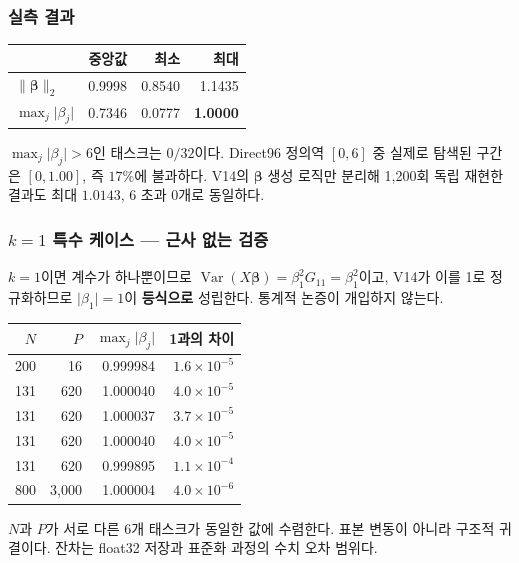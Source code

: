 \documentclass[11pt,a4paper]{article}
\theoremstyle{definition}
\newcommand{\bbeta}{\boldsymbol{\beta}}
\begin{document}
\subsubsection{실측 결과}

\begin{center}
\begin{tabular}{@{}lrrr@{}}
\toprule
& \textbf{중앙값} & \textbf{최소} & \textbf{최대}\\
\midrule
\(\lVert\bbeta\rVert_2\) & 0.9998 & 0.8540 & 1.1435\\
\(\max_j\lvert\beta_j\rvert\) & 0.7346 & 0.0777 & \textbf{1.0000}\\
\bottomrule
\end{tabular}
\end{center}

\(\max_j\lvert\beta_j\rvert>6\)인 태스크는 \(0/32\)이다. Direct96 정의역 \([0,6]\) 중 실제로 탐색된 구간은 \([0,1.00]\), 즉 \(17\%\)에 불과하다. V14의 \(\bbeta\) 생성 로직만 분리해 1{,}200회 독립 재현한 결과도 최대 \(1.0143\), 6 초과 0개로 동일하다.

\subsubsection{\(k=1\) 특수 케이스 --- 근사 없는 검증}

\(k=1\)이면 계수가 하나뿐이므로 \(\operatorname{Var}(X\bbeta)=\beta_1^2 G_{11}=\beta_1^2\)이고, V14가 이를 1로 정규화하므로 \(\lvert\beta_1\rvert=1\)이 \textbf{등식으로} 성립한다. 통계적 논증이 개입하지 않는다.

\begin{center}
\small
\begin{tabular}{@{}rrrr@{}}
\toprule
\(N\) & \(P\) & \(\max_j\lvert\beta_j\rvert\) & 1과의 차이\\
\midrule
200 & 16 & 0.999984 & \(1.6\times10^{-5}\)\\
131 & 620 & 1.000040 & \(4.0\times10^{-5}\)\\
131 & 620 & 1.000037 & \(3.7\times10^{-5}\)\\
131 & 620 & 1.000040 & \(4.0\times10^{-5}\)\\
131 & 620 & 0.999895 & \(1.1\times10^{-4}\)\\
800 & 3{,}000 & 1.000004 & \(4.0\times10^{-6}\)\\
\bottomrule
\end{tabular}
\end{center}

\(N\)과 \(P\)가 서로 다른 6개 태스크가 동일한 값에 수렴한다. 표본 변동이 아니라 구조적 귀결이다. 잔차는 float32 저장과 표준화 과정의 수치 오차 범위다.
\end{document}
